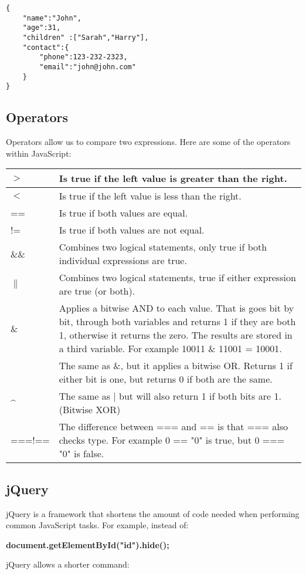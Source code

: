 \documentclass[portfolio.tex]{subfiles}
\begin{document}
				\begin{lstlisting}
{
	"name":"John",
	"age":31,
	"children" :["Sarah","Harry"],
	"contact":{
		"phone":123-232-2323,
		"email":"john@john.com"
	}
}
				\end{lstlisting}

			\subsection{Operators}
				Operators allow us to compare two expressions. Here are some of the operators within JavaScript:\\

				\begin{tabular}{|P{2cm}|p{14cm}|}
					\hline
					$>$&  Is true if the left value is greater than the right.\\
					\hline
					$<$&  Is true if the left value is less than the right.\\
					\hline
					==&  Is true if both values are equal.\\
					\hline
					!=&  Is true if both values are not equal.\\
					\hline
					\&\&&  Combines two logical statements, only true if both individual expressions are true.\\
					\hline
					$\|$&  Combines two logical statements, true if either expression are true (or both).\\
					\hline
					\& &  Applies a bitwise AND to each value. That is goes bit by bit, through both variables and returns 1 if they are both 1, otherwise it returns the zero. The results are stored in a third variable. For example 10011 \& 11001 = 10001. \\
					\hline
					\textbar &   The same as \&, but it applies a bitwise OR. Returns 1 if either bit is one, but returns 0 if both are the same.\\
					\hline
					\^{} &  The same as | but will also return 1 if both bits are 1. (Bitwise XOR)\\
					\hline
					===\newline !== & The difference between === and == is that === also checks type. For example 0 == "0" is true, but 0 === "0" is false.\\
					\hline
				\end{tabular}

			\subsection{jQuery}
				jQuery is a framework that shortens the amount of code needed when performing common JavaScript tasks. For example, instead of:\\
				 \begin{center}
					\textbf{document.getElementById("id").hide();}\\
				 \end{center}
				jQuery allows a shorter command:
\end{document}
